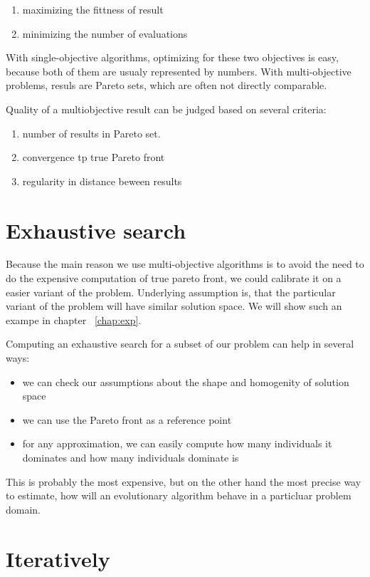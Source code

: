 \documentclass[12pt,oneside]{fithesis2}
\begin{document}
\begin{enumerate}
\item maximizing the fittness of result
\item minimizing the number of evaluations
\end{enumerate}
With single-objective algorithms, optimizing for these two objectives is easy, because both of them are usualy represented by numbers.
With multi-objective problems, resuls are Pareto sets, which are often not directly comparable.

Quality of a multiobjective result can be judged based on several criteria:
\begin{enumerate}
\item number of results in Pareto set.
\item convergence tp true Pareto front
\item regularity in distance beween results
\end{enumerate}


\section{Exhaustive search}
Because the main reason we use multi-objective algorithms is to avoid the need to do the expensive computation of true pareto front,
we could calibrate it on a easier variant of the problem. Underlying assumption is, that the particular variant of the problem will have similar solution space. We will show such an exampe in chapter ~\ref{chap:exp}.

Computing an exhaustive search for a subset of our problem can help in several ways:
\begin{itemize}
  \item we can check our assumptions about the shape and homogenity of solution space
  \item we can use the Pareto front as a reference point
  \item for any approximation, we can easily compute how many individuals it dominates and how many individuals dominate is
\end{itemize}

This is probably the most expensive, but on the other hand the most precise way to estimate, how will an evolutionary algorithm behave in a particluar problem domain.


\section{Iteratively}
\end{document}
